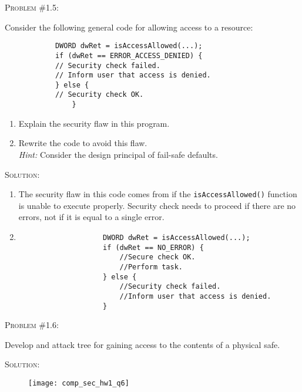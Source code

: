\documentclass[12pt]{article}
\newenvironment{problem}[1]
{\begin{mdframed}[linewidth=0.6pt]
        \textsc{Problem #1:}

}
    {\end{mdframed}}
\newenvironment{solution}
    {\textsc{Solution:}\\}
    {\newpage}%
\begin{document}
	\begin{problem}{\#1.5}
		Consider the following general code for allowing access to a resource:
		\begin{verbatim}
			DWORD dwRet = isAccessAllowed(...);
			if (dwRet == ERROR_ACCESS_DENIED) {
			// Security check failed.
			// Inform user that access is denied.
			} else {
			// Security check OK.
		    	}
		\end{verbatim}
		\begin{enumerate}[label=\alph*]
			\item Explain the security flaw in this program.
			\item Rewrite the code to avoid this flaw.\\
				\textit{Hint:} Consider the design principal of fail-safe defaults.
		\end{enumerate}
	\end{problem}
	\begin{solution}
		\begin{enumerate}[label=\alph*]
			\item The security flaw in this code comes from if the \verb|isAccessAllowed()|
				function is unable to execute properly. Security check needs to proceed
				if there are no errors, not if it is equal to a single error.
			\item
				\begin{verbatim}
					DWORD dwRet = isAccessAllowed(...);
					if (dwRet == NO_ERROR) {
					    //Secure check OK.
					    //Perform task.
					} else {
					    //Security check failed.
					    //Inform user that access is denied.
					}
				\end{verbatim}
		\end{enumerate}
	\end{solution}

	\begin{problem}{\#1.6}
		Develop and attack tree for gaining access to the contents of a physical safe.
	\end{problem}
	\begin{solution}
		\begin{figure}[ht!]
			\centering
			\texttt{[image: comp\_sec\_hw1\_q6]}
		\end{figure}
	\end{solution}
\end{document}
